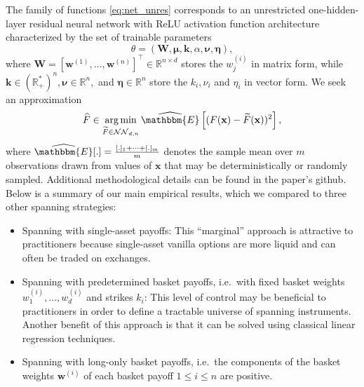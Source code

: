 \documentclass[11pt,A4,twoside]{article}
\numberwithin{equation}{section}
\renewcommand{\vec}{\mathbf}
\newcommand{\eh}{\widehat{\ex}}
\newcommand{\x}{\mathbf{x}}
\newcommand{\ex}{\mathbbm{E}}
\newcommand{\R}{\mathbbm{R}}
\newcommand{\nn}{\mathcal{NN}}
\DeclareMathOperator*{\argmin}{\arg\min}
\theoremstyle{definition}
\theoremstyle{remark}
\def\R{\mathbb{R}}
\def\cdots{\dots}
\def\then{l}\def\then{n}%
\def\them{n}\def\them{m}%
\begin{document}
 The family of functions \eqref{eq:net_unres} corresponds to an unrestricted one-hidden-layer residual neural network with ReLU activation function architecture characterized by the set of trainable parameters
\[ 
    \theta = (\vec W, \boldsymbol \mu,  \vec k,\alpha,  \boldsymbol \nu,  \boldsymbol \eta ),
\]
where $ \vec W=  [\vec w^{(1)}, \cdots, \vec w^{(\then)}] ^\top\in\R^{\then \times d}$ stores the $w_j^{(i)}$ in matrix form, while $\vec k \in (\R_+^*)^{\then} ,  \boldsymbol \nu \in \R^{\then}, $ and $\boldsymbol \eta\in \R^{\then}$ store the $k_i, \nu_i$ and $\eta_i$ in vector form. 
We seek an approximation
\begin{align}
    \widehat{F} \in \argmin_{\theNN \in \nn_{d,\then }} \eh \left[(F(\x) - \theNN(\x))^2\right],
    \label{eq:loss}
\end{align}
where $\widehat{\ex}[.]= \frac{[.]_1+\cdots+[.]_\them}\them$ denotes the sample mean over $\them$ observations drawn from values of $\vec x$ that may be deterministically or randomly sampled.
Additional methodological details can be found in the paper's github. Below is a summary of our main empirical results, which we compared to three other spanning strategies:%
\begin{itemize}[leftmargin=*,topsep=0pt,itemsep=1pt,partopsep=0pt,parsep=0pt,listparindent=0pt]
    \item Spanning with single-asset payoffs: This ``marginal'' approach is attractive to practitioners because single-asset vanilla options are more liquid and can often be traded on exchanges.
    \item Spanning with predetermined basket payoffs, i.e.\ with fixed basket weights $w_1^{(i)}, \cdots, w_d^{(i)}$ and strikes $k_i$:  This level of control may be beneficial to practitioners in order to define a tractable universe of spanning instruments.  Another benefit of this approach is that it can be solved using classical linear regression techniques.
    \item Spanning with long-only basket payoffs, i.e.\ the components of the  basket weights $\vec w^{(i)}$ of each basket payoff $1 \leq i \leq \then $ are  positive. 
\end{itemize}
\end{document}
